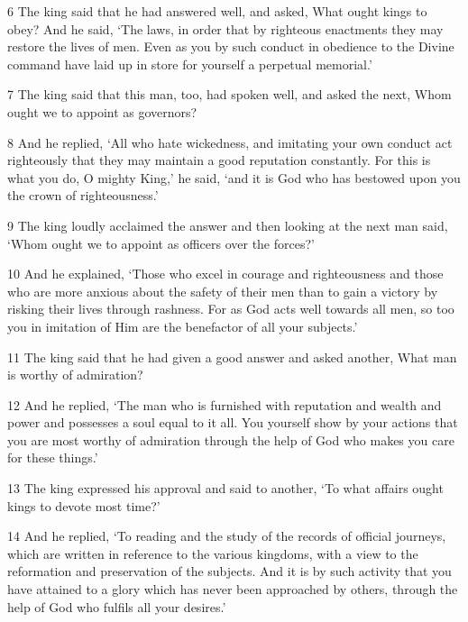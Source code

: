 \par 6 The king said that he had answered well, and asked, What ought kings to obey? And he said, ‘The laws, in order that by righteous enactments they may restore the lives of men. Even as you by such conduct in obedience to the Divine command have laid up in store for yourself a perpetual memorial.’

\par 7 The king said that this man, too, had spoken well, and asked the next, Whom ought we to appoint as governors?

\par 8 And he replied, ‘All who hate wickedness, and imitating your own conduct act righteously that they may maintain a good reputation constantly. For this is what you do, O mighty King,’ he said, ‘and it is God who has bestowed upon you the crown of righteousness.’

\par 9 The king loudly acclaimed the answer and then looking at the next man said, ‘Whom ought we to appoint as officers over the forces?’

\par 10 And he explained, ‘Those who excel in courage and righteousness and those who are more anxious about the safety of their men than to gain a victory by risking their lives through rashness. For as God acts well towards all men, so too you in imitation of Him are the benefactor of all your subjects.’

\par 11 The king said that he had given a good answer and asked another, What man is worthy of admiration?

\par 12 And he replied, ‘The man who is furnished with reputation and wealth and power and possesses a soul equal to it all. You yourself show by your actions that you are most worthy of admiration through the help of God who makes you care for these things.’

\par 13 The king expressed his approval and said to another, ‘To what affairs ought kings to devote most time?’

\par 14 And he replied, ‘To reading and the study of the records of official journeys, which are written in reference to the various kingdoms, with a view to the reformation and preservation of the subjects. And it is by such activity that you have attained to a glory which has never been approached by others, through the help of God who fulfils all your desires.’

